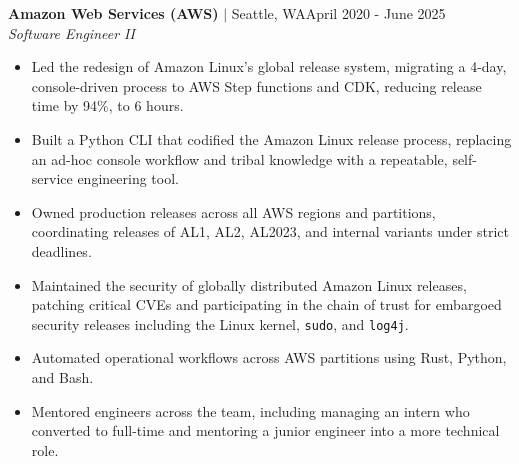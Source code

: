 \documentclass[overlapped,line]{res}
\begin{document}
\begin{resume}
\textbf{Amazon Web Services (AWS)} $|$ Seattle, WA\hfill April 2020 - June 2025\\
{\sl Software Engineer II}
\begin{itemize} \itemsep -2pt
	\item Led the redesign of Amazon Linux's global release system,
		migrating a 4-day, console-driven process to AWS Step functions
		and CDK, reducing release time by 94\%, to 6 hours.
	\item Built a Python CLI that codified the Amazon Linux release process,
		replacing an ad-hoc console workflow and tribal knowledge with a
		repeatable, self-service engineering tool.
	\item Owned production releases across all AWS regions and partitions,
		coordinating releases of AL1, AL2, AL2023, and internal variants
		under strict deadlines.
	\item Maintained the security of globally distributed Amazon Linux
		releases, patching critical CVEs and participating in the chain of trust for embargoed
		security releases including the Linux kernel, \texttt{sudo}, and \texttt{log4j}.
	\item Automated operational workflows across AWS partitions using Rust, Python, and Bash.
	\item Mentored engineers across the team, including managing an intern
		who converted to full-time and mentoring a junior engineer into
		a more technical role.
\end{itemize}


\end{resume}
\end{document}
